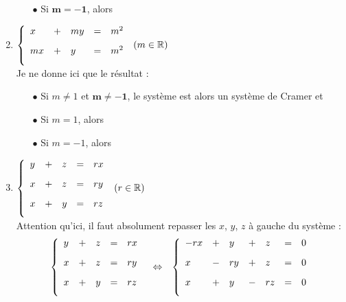 \documentclass[a4paper, 11pt,reqno]{article}
\begin{document}
\begin{correction}
\begin{enumerate}
\begin{itemize}
\item[$\bullet$]  Si $\mathbf{m=-1}$, alors 
\end{itemize}
\vsec
\item 
$\mathbf{\left\lbrace\begin{array}{lllll}
x & + & my & = & m^2\vsec\\
mx & + & y & = & m^2\vsec\\
\end{array}\right.}$    $(m\in\R)$\vsec\\
Je ne donne ici que le r\'esultat :\vsec
\begin{itemize}
\item[$\bullet$] Si $m\not= 1$ et $\mathbf{m\not= -1}$, le syst\`eme est alors un syst\`eme de Cramer et  
\item[$\bullet$] Si $m=1$, alors  
\item[$\bullet$] Si $m=-1$, alors  
\end{itemize}
\vsec
\item 
$\left\lbrace\begin{array}{lllll}
y & + & z & = & rx\vsec\\
x & + & z & = & ry\vsec\\
x & + & y & = & rz\vsec\\
\end{array}\right.$    $(r\in\R)$\\
Attention qu'ici, il faut absolument repasser les $x$, $y$, $z$ \`a gauche du syst\`eme :
$$\begin{array}{rcl}
\left\lbrace\begin{array}{lllll}
y & + & z & = & rx\vsec\\
x & + & z & = & ry\vsec\\
x & + & y & = & rz\vsec\\
\end{array}\right.
& \Leftrightarrow & 
\left\lbrace\begin{array}{lllllll}
-rx & +& y & + & z & = &0\vsec\\
x & -& ry & + & z & = &0\vsec\\
x & + & y & - & rz&  = &0\vsec\\
\end{array}\right.\vsec\\

\end{array}$$
\end{enumerate}
\end{correction}
\end{document}
